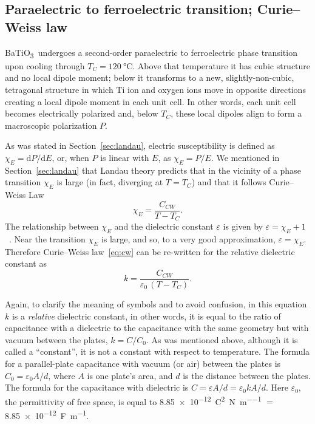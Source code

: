 \documentclass[11pt,a4paper]{article}
\newcommand{\BTO}{BaTiO\textsubscript{3}}
\begin{document}
\subsection{Paraelectric to ferroelectric transition; Curie--Weiss law}

\BTO\ undergoes a second-order paraelectric to ferroelectric phase transition upon
cooling through $T_C = \SI{120}{\degreeCelsius}$. Above that temperature it has
cubic structure and no local dipole moment; below it transforms to a new,
slightly-non-cubic, tetragonal structure in which Ti ion and oxygen ions move in
opposite directions creating a local dipole moment in each unit cell. In other
words, each unit cell becomes electrically polarized and, below $T_C$, these local
dipoles align to form a macroscopic polarization $P$.

As was stated in Section~\ref{sec:landau}, electric susceptibility is defined as
$\chi_E = \mathrm{d}P/\mathrm{d}E$, or, when $P$ is linear with $E$, as
$\chi_E = P/E$. We mentioned in Section~\ref{sec:landau} that Landau theory predicts
that in the vicinity of a phase transition $\chi_E$ is large (in fact, diverging at
$T = T_C$) and that it follows Curie--Weiss Law
\begin{equation}\label{eq:cw}
  \chi_E = \frac{C_{CW}}{T - T_C}.
\end{equation}
The relationship between $\chi_E$ and the dielectric constant $\varepsilon$ is given
by $\varepsilon = \chi_E + 1$~\cite{ref:lockin,ref:accircuits,ref:papon,ref:blakemore}.
Near the transition $\chi_E$ is large, and so, to a very good approximation,
$\varepsilon = \chi_E$. Therefore Curie--Weiss law~\eqref{eq:cw} can be re-written
for the relative dielectric constant as
\begin{equation}\label{eq:cwk}
  k = \frac{C_{CW}}{\varepsilon_0\,(T - T_C)}.
\end{equation}

Again, to clarify the meaning of symbols and to avoid confusion, in this equation
$k$ is a \emph{relative} dielectric constant, in other words, it is equal to the
ratio of capacitance with a dielectric to the capacitance with the same geometry but
with vacuum between the plates, $k = C/C_0$. As was mentioned above, although it is
called a ``constant'', it is not a constant with respect to temperature. The formula
for a parallel-plate capacitance with vacuum (or air) between the plates is
$C_0 = \varepsilon_0 A/d$, where $A$ is one plate's area, and $d$ is the distance
between the plates. The formula for the capacitance with dielectric is
$C = \varepsilon A/d = \varepsilon_0 k A/d$. Here $\varepsilon_0$, the permittivity
of free space, is equal to
\SI{8.85e-12}{\coulomb\squared\per\newton\per\metre} $=$
\SI{8.85e-12}{\farad\per\metre}.
\end{document}

